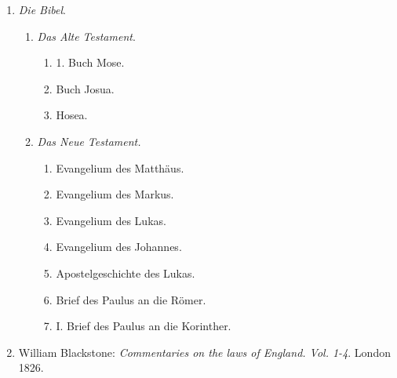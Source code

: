 \begin{enumerate}
\item \textit{Die Bibel}.
\begin{enumerate}
    \item \textit{Das Alte Testament}.
    \begin{enumerate}
        \item 1. Buch Mose.
        \item Buch Josua.
        \item Hosea.
    \end{enumerate}
    \item \textit{Das Neue Testament.}
    \begin{enumerate}
        \item Evangelium des Matthäus.
        \item Evangelium des Markus.
        \item Evangelium des Lukas.
        \item Evangelium des Johannes.
        \item Apostelgeschichte des Lukas.
        \item Brief des Paulus an die Römer.
        \item I. Brief des Paulus an die Korinther.
    \end{enumerate}
\end{enumerate}

\item William Blackstone: \textit{Commentaries on the laws of England. Vol. 1-4}. London 1826.






\end{enumerate}
